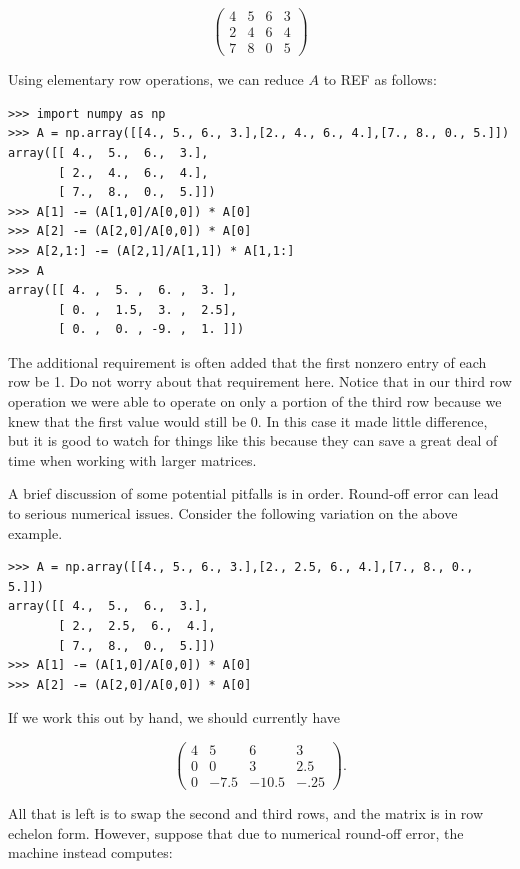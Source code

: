 \[
\begin{pmatrix}
4&5&6&3 \\
2&4&6&4 \\
7&8&0&5
\end{pmatrix}
\]

Using elementary row operations, we can reduce $A$ to REF as follows:

\begin{lstlisting}
>>> import numpy as np
>>> A = np.array([[4., 5., 6., 3.],[2., 4., 6., 4.],[7., 8., 0., 5.]])
array([[ 4.,  5.,  6.,  3.],
       [ 2.,  4.,  6.,  4.],
       [ 7.,  8.,  0.,  5.]])
>>> A[1] -= (A[1,0]/A[0,0]) * A[0]
>>> A[2] -= (A[2,0]/A[0,0]) * A[0]
>>> A[2,1:] -= (A[2,1]/A[1,1]) * A[1,1:]
>>> A
array([[ 4. ,  5. ,  6. ,  3. ],
       [ 0. ,  1.5,  3. ,  2.5],
       [ 0. ,  0. , -9. ,  1. ]])
\end{lstlisting}

The additional requirement is often added that the first nonzero entry of each row be 1. Do not worry about that requirement here.
Notice that in our third row operation we were able to operate on only a portion of the third row because we knew that the first value would still be 0. In this case it made little difference, but it is good to watch for things like this because they can save a great deal of time when working with larger matrices.

A brief discussion of some potential pitfalls is in order.
Round-off error can lead to serious numerical issues. Consider the
following variation on the above example.

\begin{lstlisting}
>>> A = np.array([[4., 5., 6., 3.],[2., 2.5, 6., 4.],[7., 8., 0., 5.]])
array([[ 4.,  5.,  6.,  3.],
       [ 2.,  2.5,  6.,  4.],
       [ 7.,  8.,  0.,  5.]])
>>> A[1] -= (A[1,0]/A[0,0]) * A[0]
>>> A[2] -= (A[2,0]/A[0,0]) * A[0]
\end{lstlisting}

If we work this out by hand, we should currently have

\[
\begin{pmatrix}
4&5&6&3 \\
0&0&3&2.5 \\
0&-7.5&-10.5&-.25
\end{pmatrix}.
\]

All that is left is to swap the second and third rows, and the matrix is in row echelon form. However, suppose that due to numerical round-off error, the machine instead computes:

